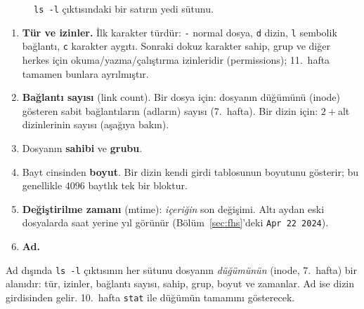\documentclass[11pt,a4paper]{article}
\newcommand{\cmd}[1]{\texttt{#1}}
\begin{document}
\begin{figure}[H]
\centering
{}
\caption{\cmd{ls -l} çıktısındaki bir satırın yedi sütunu.}
\label{fig:lsl}
\end{figure}

\begin{enumerate}[leftmargin=1.4em]
  \item \textbf{Tür ve izinler.} İlk karakter türdür: \texttt{-} normal dosya, \texttt{d} dizin, \texttt{l} sembolik bağlantı, \texttt{c} karakter aygıtı. Sonraki dokuz karakter sahip, grup ve diğer herkes için okuma/yazma/çalıştırma izinleridir (permissions); 11.\ hafta tamamen bunlara ayrılmıştır.
  \item \textbf{Bağlantı sayısı} (link count). Bir dosya için: dosyanın düğümünü (inode) gösteren sabit bağlantıların (adların) sayısı (7.\ hafta). Bir dizin için: $2 + {}$alt dizinlerinin sayısı (aşağıya bakın).
  \item Dosyanın \textbf{sahibi} ve \textbf{grubu}.
  \item Bayt cinsinden \textbf{boyut}. Bir dizin kendi girdi tablosunun boyutunu gösterir; bu genellikle $4096$ baytlık tek bir bloktur.
  \item \textbf{Değiştirilme zamanı} (mtime): \emph{içeriğin} son değişimi. Altı aydan eski dosyalarda saat yerine yıl görünür (Bölüm~\ref{sec:fhs}'deki \texttt{Apr 22 2024}).
  \item \textbf{Ad.}
\end{enumerate}

\begin{keyidea}
Ad dışında \cmd{ls -l} çıktısının her sütunu dosyanın \emph{düğümünün} (inode, 7.\ hafta) bir alanıdır: tür, izinler, bağlantı sayısı, sahip, grup, boyut ve zamanlar. Ad ise dizin girdisinden gelir. 10.\ hafta \cmd{stat} ile düğümün tamamını gösterecek.
\end{keyidea}
\end{document}
